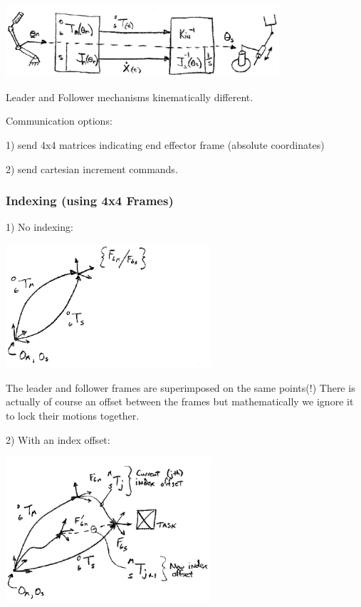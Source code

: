 \includegraphics[width=4.0in]{figs14/00404.eps}

Leader and Follower mechanisms kinematically different.

Communication options:

1) send 4x4 matrices indicating end effector frame (absolute coordinates)

2) send cartesian increment commands.


\subsubsection{Indexing (using 4x4 Frames)}

1) No indexing:

\includegraphics[width=3.0in]{figs14/00405.eps}

 The leader and follower frames are superimposed on the same points(!)    There is actually of course an offset between the frames but mathematically we ignore it to lock their motions together. 	%



2) With an index offset:

\includegraphics[width=3.0in]{figs14/00406.eps}

